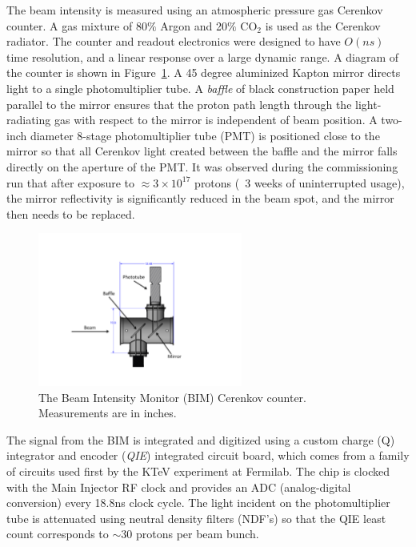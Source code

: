 The beam intensity is measured using an atmospheric pressure gas Cerenkov counter. A gas mixture of 80$\%$ Argon and 20$\%$ CO$_2$
is used as the Cerenkov radiator. The counter and readout electronics were designed to have $O(ns)$ time resolution, and a linear
response over a large dynamic range.  A diagram of the counter is shown in Figure~\ref{fig:BIMCerenkov}.  A 45 degree aluminized
Kapton mirror directs light to a single photomultiplier tube.  A \emph{baffle} of black construction paper held parallel to the
mirror ensures that the proton path length through the light-radiating gas with respect to the mirror is independent of beam
position. A two-inch diameter 8-stage photomultiplier tube (PMT) is positioned close to the mirror so that all Cerenkov light created between the baffle and the mirror falls directly on the aperture of the PMT. It was observed during the commissioning run
that after exposure to $\approx 3 \times 10^{17}$ protons (~3 weeks of uninterrupted usage), the mirror reflectivity is significantly reduced in the beam spot, and the mirror then needs to be replaced.

\begin{figure}
	\begin{center}
		\includegraphics[width=0.6\textwidth]{figures/BIMCerenkov.pdf}
		\caption{The Beam Intensity Monitor (BIM) Cerenkov counter. Measurements are in inches.}
		\label{fig:BIMCerenkov}
	\end{center}
\end{figure}

The signal from the BIM is integrated and digitized using a custom charge (Q) integrator and encoder (\emph{QIE}) integrated circuit board, which comes from a family of circuits used first by the KTeV experiment at Fermilab\cite{QIE}. The chip is clocked with the Main Injector RF clock and provides an ADC (analog-digital conversion) every 18.8ns clock cycle. The light incident on
the photomultiplier tube is attenuated using neutral density filters (NDF's) so that the QIE least count corresponds to
$\sim$30 protons per beam bunch.

